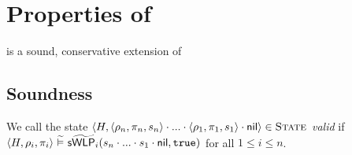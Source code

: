 \documentclass {llncs}
\begin{document}
%
%
%
%
\section{Properties of \gvlrp}
\newcommand{\almosteq}{\lesssim}
\gvlidf is a sound, conservative extension of \svlrp

\subsection{Soundness}
\begin{definition}\label{def:gvlrp-valid-conf-equi}
    We call the state $\langle H, \langle \rho_n, \pi_n, s_n \rangle \cdot ... \cdot \langle \rho_1, \pi_1, s_1 \rangle \cdot \textup{\textmd{\textsf{nil}}} \rangle \in \textup{\textsc{State}}$ {\em valid} if $\langle H, \rho_i, \pi_i \rangle \,\,\widetilde{\vDash}\,\, \textup{\textmd{\textsf{s}}}\widetilde{\textup{\textmd{\textsf{WLP}}}}_i(s_n \cdot ... \cdot s_1 \cdot \textup{\textmd{\textsf{nil}}}, \textup{\texttt{true}})$ for all $1 \leq i \leq n$.
\end{definition}
\end{document}
